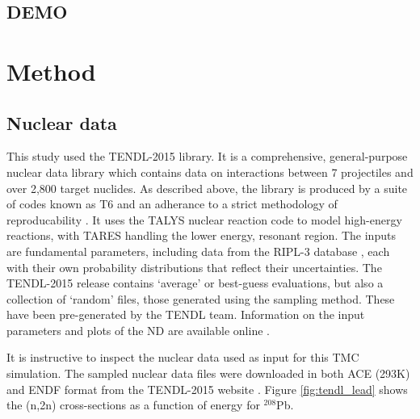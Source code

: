 \FloatBarrier
\subsection{DEMO}

\FloatBarrier
\section{Method}

\subsection{Nuclear data}
\label{sec:data}
This study used the TENDL-2015 library. It is a comprehensive, general-purpose nuclear data library which contains data on interactions between 7 projectiles and over 2,800 target nuclides. As described above, the library is produced by a suite of codes known as T6 and an adherance to a strict methodology of reproducability \cite{Rochman2016}. It uses the TALYS nuclear reaction code to model high-energy reactions, with TARES handling the lower energy, resonant region. The inputs are fundamental parameters, including data from the RIPL-3 database \cite{Capote2009}, each with their own probability distributions that reflect their uncertainties. The TENDL-2015 release contains `average' or best-guess evaluations, but also a collection of `random' files, those generated using the sampling method. These have been pre-generated by the TENDL team. Information on the input parameters and plots of the ND are available online \cite{TENDL2015}.

It is instructive to inspect the nuclear data used as input for this TMC simulation. The sampled nuclear data files were downloaded in both ACE (293K) and ENDF format from the TENDL-2015 website \cite{TENDL2015}. Figure \ref{fig:tendl_lead} shows the (n,2n) cross-sections as a function of energy for $^{208}$Pb. 


